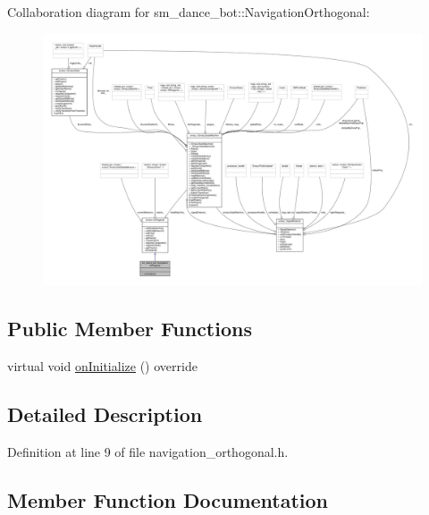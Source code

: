 Collaboration diagram for sm\+\_\+dance\+\_\+bot\+:\+:Navigation\+Orthogonal\+:
\nopagebreak
\begin{figure}[H]
\begin{center}
\leavevmode
\includegraphics[width=350pt]{classsm__dance__bot_1_1NavigationOrthogonal__coll__graph}
\end{center}
\end{figure}
\subsection*{Public Member Functions}
\begin{DoxyCompactItemize}
\item 
virtual void \hyperlink{classsm__dance__bot_1_1NavigationOrthogonal_a2087b378406e35f0c7e6e31f21d37958}{on\+Initialize} () override
\end{DoxyCompactItemize}


\subsection{Detailed Description}


Definition at line 9 of file navigation\+\_\+orthogonal.\+h.



\subsection{Member Function Documentation}
